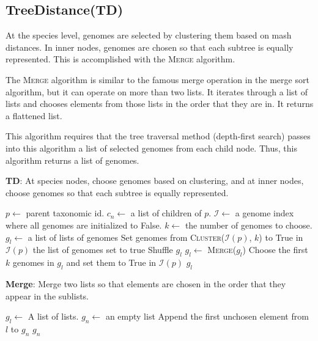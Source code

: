 \documentclass[12pt, letterpaper]{article}
\begin{document}
\newpage


\subsection{TreeDistance(TD)}
At the species level, genomes are selected by clustering them based on mash distances.  In inner nodes, genomes are chosen so that each subtree is equally represented.  This is accomplished with the \textsc{Merge} algorithm.  

The \textsc{Merge} algorithm is similar to the famous merge operation in the merge sort algorithm, but it can operate on more than two lists.  It iterates through a list of lists and chooses elements from those lists in the order that they are in.  It returns a flattened list.

This algorithm requires that the tree traversal method (depth-first search) passes into this algorithm a list of selected genomes from each child node.  Thus, this algorithm returns a list of genomes.

\begin{algorithm}[h!]
\caption{\textbf{TD}: At species nodes, choose genomes based on clustering, and at inner nodes, choose genomes so that each subtree is equally represented.}
\label{TD}
\begin{algorithmic}
\State $p \gets$ parent taxonomic id.
\State $c_n \gets$ a list of children of $p$.
\State $\mathcal{I} \gets$ a genome index where all genomes are initialized to False.
\State $k \gets$ the number of genomes to choose.
\State $g_l \gets$ a list of lists of genomes
 
\State Set genomes from \textsc{Cluster}($\mathcal{I}(p)$, $k$) to True in $\mathcal{I}(p)$
\State \Return the list of genomes set to true
\Else {}
\State Shuffle $g_l$
\State $g_l \gets$ \textsc{Merge}($g_l$)
\State Choose the first $k$ genomes in $g_l$ and set them to True in  $\mathcal{I}(p)$
\State \Return $g_l$
\EndIf
\EndProcedure
\end{algorithmic}
\end{algorithm}


\begin{algorithm}[h!]
\caption{\textbf{Merge}: Merge two lists so that elements are chosen in the order that they appear in the sublists.}
\label{Merge}
\begin{algorithmic}
\State $g_l \gets$ A list of lists.
\State $g_n \gets$ an empty list
\State Append the first unchosen element from $l$ to $g_n$
\EndFor
\EndWhile
\State \Return $g_n$
\EndProcedure
\end{algorithmic}
\end{algorithm}
\end{document}
